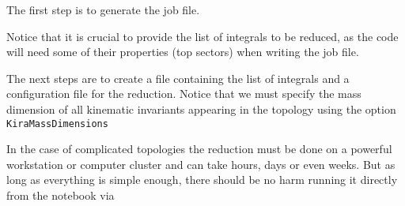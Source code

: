 \documentclass[../FeynHelpersManual.tex]{subfiles}
\begin{document}
The first step is to generate the job file.

\begin{Shaded}
\begin{Highlighting}[]
\OperatorTok{[}\OperatorTok{,}\OperatorTok{,} \OperatorTok{[]]}
\end{Highlighting}
\end{Shaded}

Notice that it is crucial to provide the list of integrals to be
reduced, as the code will need some of their properties (top sectors)
when writing the job file.

The next steps are to create a file containing the list of integrals and
a configuration file for the reduction. Notice that we must specify the
mass dimension of all kinematic invariants appearing in the topology
using the option \texttt{KiraMassDimensions}

\begin{Shaded}
\begin{Highlighting}[]
\OperatorTok{[}\OperatorTok{,}\OperatorTok{,} \OperatorTok{[]]}
\OperatorTok{[}\OperatorTok{,}\OperatorTok{,} \OperatorTok{[],} 
\OtherTok{{-}\textgreater{}} \OperatorTok{\{}\OtherTok{{-}\textgreater{}} \OperatorTok{\}]}
\end{Highlighting}
\end{Shaded}

In the case of complicated topologies the reduction must be done on a
powerful workstation or computer cluster and can take hours, days or
even weeks. But as long as everything is simple enough, there should be
no harm running it directly from the notebook via

\begin{Shaded}
\begin{Highlighting}[]
\OperatorTok{[}\OperatorTok{[],}\OperatorTok{,} 
\OtherTok{{-}\textgreater{}} \OperatorTok{[\{}\OperatorTok{,} \OperatorTok{,} \OperatorTok{\}],}
\OtherTok{{-}\textgreater{}} \OperatorTok{[\{}\OperatorTok{,} \OperatorTok{,} \OperatorTok{,} \OperatorTok{\}]]}
\end{Highlighting}
\end{Shaded}
\end{document}
